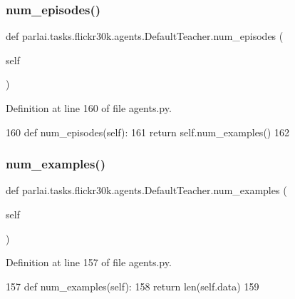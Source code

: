 \subsubsection{\texorpdfstring{num\+\_\+episodes()}{num\_episodes()}}
{\footnotesize\ttfamily def parlai.\+tasks.\+flickr30k.\+agents.\+Default\+Teacher.\+num\+\_\+episodes (\begin{DoxyParamCaption}\item[{}]{self }\end{DoxyParamCaption})}



Definition at line 160 of file agents.\+py.


\begin{DoxyCode}
160     \textcolor{keyword}{def }num\_episodes(self):
161         \textcolor{keywordflow}{return} self.num\_examples()
162 
\end{DoxyCode}
\mbox{\label{classparlai_1_1tasks_1_1flickr30k_1_1agents_1_1DefaultTeacher_a58f86f4eb5a109d5c2a9034d701d452c}} 
\subsubsection{\texorpdfstring{num\+\_\+examples()}{num\_examples()}}
{\footnotesize\ttfamily def parlai.\+tasks.\+flickr30k.\+agents.\+Default\+Teacher.\+num\+\_\+examples (\begin{DoxyParamCaption}\item[{}]{self }\end{DoxyParamCaption})}



Definition at line 157 of file agents.\+py.


\begin{DoxyCode}
157     \textcolor{keyword}{def }num\_examples(self):
158         \textcolor{keywordflow}{return} len(self.data)
159 
\end{DoxyCode}
\mbox{\label{classparlai_1_1tasks_1_1flickr30k_1_1agents_1_1DefaultTeacher_a19271160caed973aa96611d3898a6209}} 
